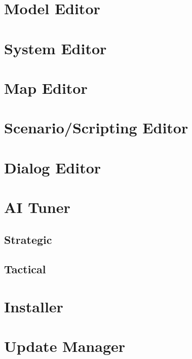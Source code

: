 \section{Model Editor}
\section{System Editor}
\section{Map Editor}
\section{Scenario/Scripting Editor}
\section{Dialog Editor}
\section{AI Tuner}
\subsection{Strategic}
\subsection{Tactical}
\section{Installer}
\section{Update Manager}
